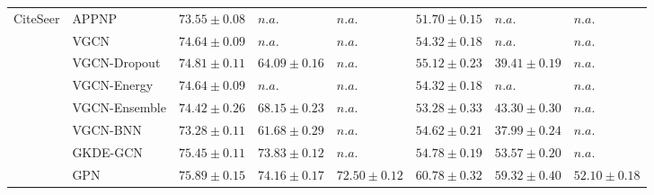 \begin{table}[ht]
{\begin{tabular}{ll|lll|lll}
            \multirow{8}{*}{CiteSeer} 
             &          APPNP &    $73.55 \pm 0.08$ &               $n.a.$ &                $n.a.$ &   $51.70 \pm 0.15$ &              $n.a.$ &               $n.a.$ \\
             &           VGCN &    $74.64 \pm 0.09$ &               $n.a.$ &                $n.a.$ &   $54.32 \pm 0.18$ &              $n.a.$ &               $n.a.$ \\
             &   VGCN-Dropout &    $74.81 \pm 0.11$ &    $64.09 \pm 0.16$ &                $n.a.$ &   $55.12 \pm 0.23$ &   $39.41 \pm 0.19$ &               $n.a.$ \\
             &    VGCN-Energy &    $74.64 \pm 0.09$ &               $n.a.$ &                $n.a.$ &   $54.32 \pm 0.18$ &              $n.a.$ &               $n.a.$ \\
             &  VGCN-Ensemble &    $74.42 \pm 0.26$ &    $68.15 \pm 0.23$ &                $n.a.$ &   $53.28 \pm 0.33$ &   $43.30 \pm 0.30$ &               $n.a.$ \\
             &       VGCN-BNN &    $73.28 \pm 0.11$ &    $61.68 \pm 0.29$ &                $n.a.$ &   $54.62 \pm 0.21$ &   $37.99 \pm 0.24$ &               $n.a.$ \\
             &        GKDE-GCN &    $75.45 \pm 0.11$ &    $73.83 \pm 0.12$ &                $n.a.$ &   $54.78 \pm 0.19$ &   $53.57 \pm 0.20$ &               $n.a.$ \\
             &            GPN &    $\mathbf{75.89 \pm 0.15}$ &    $74.16 \pm 0.17$ &     $72.50 \pm 0.12$ &   $\mathbf{60.78 \pm 0.32}$ &   $59.32 \pm 0.40$ &    $52.10 \pm 0.18$ \\
              
              \midrule
              

\end{tabular}}
\end{table}
